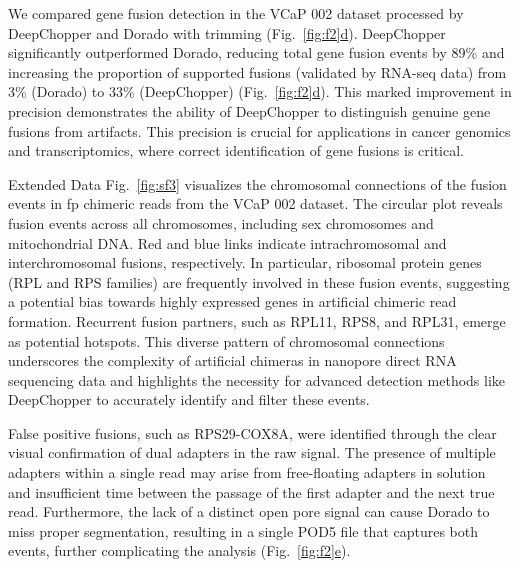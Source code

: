 \documentclass[pdflatex,sn-nature, lineno]{sn-jnl}%
\newcommand{\figref}[2]{Fig.~\hyperref[#1]{\ref*{#1}#2}}
\newcommand{\edfigref}[2]{Extended Data Fig.~\hyperref[#1]{\ref*{#1}#2}}
\theoremstyle{thmstyleone}%
\theoremstyle{thmstyletwo}%
\theoremstyle{thmstylethree}%
\begin{document}
We compared gene fusion detection in the VCaP 002 dataset processed by DeepChopper and Dorado with trimming (\figref{fig:f2}{d}).
DeepChopper significantly outperformed Dorado, reducing total gene fusion events by 89\% and increasing the proportion of supported fusions (validated by RNA-seq data) from 3\% (Dorado) to 33\% (DeepChopper)  (\figref{fig:f2}{d}).
This marked improvement in precision demonstrates the ability of DeepChopper to distinguish genuine gene fusions from artifacts.
This precision is crucial for applications in cancer genomics and transcriptomics, where correct identification of gene fusions is critical.

\edfigref{fig:sf3}{} visualizes the chromosomal connections of the fusion events in \gls{fp} chimeric reads from the VCaP 002 dataset.
The circular plot reveals fusion events across all chromosomes, including sex chromosomes and mitochondrial DNA.
Red and blue links indicate intrachromosomal and interchromosomal fusions, respectively.
In particular, ribosomal protein genes (RPL and RPS families) are frequently involved in these fusion events, suggesting a potential bias towards highly expressed genes in artificial chimeric read formation.
Recurrent fusion partners, such as RPL11, RPS8, and RPL31, emerge as potential hotspots. This diverse pattern of chromosomal connections underscores the complexity of artificial chimeras in nanopore direct RNA sequencing data and highlights the necessity for advanced detection methods like DeepChopper to accurately identify and filter these events.

False positive fusions, such as RPS29-COX8A, were identified through the clear visual confirmation of dual adapters in the raw signal. The presence of multiple adapters within a single read may arise from free-floating adapters in solution and insufficient time between the passage of the first adapter and the next true read. 
Furthermore, the lack of a distinct open pore signal can cause Dorado to miss proper segmentation, resulting in a single POD5 file that captures both events, further complicating the analysis (\figref{fig:f2}{e}).
\end{document}
